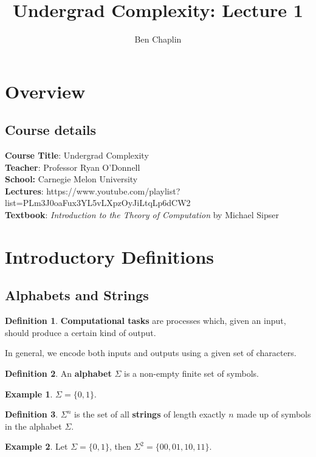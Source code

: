 \documentclass[11pt]{article}
\title{Undergrad Complexity: Lecture 1}
\author{Ben Chaplin}
\date{}
\theoremstyle{plain}
\theoremstyle{definition}
\newtheorem*{defn}{Definition}
\newtheorem*{ex}{Example}
\begin{document}
\maketitle
\tableofcontents

\section{Overview}
\subsection{Course details}

{\bf Course Title}: Undergrad Complexity\\
{\bf Teacher}: Professor Ryan O'Donnell \\
{\bf School:} Carnegie Melon University\\
{\bf Lectures}: https://www.youtube.com/playlist?list=PLm3J0oaFux3YL5vLXpzOyJiLtqLp6dCW2\\
{\bf Textbook}: {\it Introduction to the Theory of Computation} by Michael Sipser

\section{Introductory Definitions}
\subsection{Alphabets and Strings}

\begin{defn}
    {\bf Computational tasks} are processes which, given an input, should produce a certain kind of 
    output.
\end{defn}

In general, we encode both inputs and outputs using a given set of characters.

\begin{defn}
    An {\bf alphabet} $\Sigma$ is a non-empty finite set of symbols.
\end{defn}

\begin{ex}
    $\Sigma = \{0, 1\}$.
\end{ex}

\begin{defn}
    $\Sigma^n$ is the set of all {\bf strings} of length exactly $n$ made up of symbols in the
    alphabet $\Sigma$.
\end{defn}

\begin{ex}
    Let $\Sigma = \{0, 1\}$, then $\Sigma^2 = \{00, 01, 10, 11\}$.
\end{ex}
\end{document}
